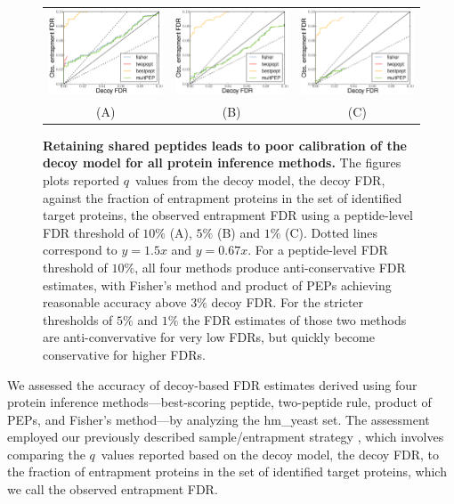 \documentclass{article}
\begin{document}
\begin{figure}
\begin{center}
\begin{tabular}{ccc} 
\includegraphics[width=0.3\linewidth]
  {./img/shared-pept-accuracy-fdr10} &
\includegraphics[width=0.3\linewidth]
  {./img/shared-pept-accuracy-fdr5} & 
\includegraphics[width=0.3\linewidth]
  {./img/shared-pept-accuracy-fdr1}\\
(A) & (B) & (C)
\end{tabular}
\caption{\label{fig:shared-accuracy}\textbf{Retaining shared peptides
    leads to poor calibration of the decoy model for all protein
    inference methods.} The figures plots reported $q$~values from the
  decoy model, the decoy FDR, against the fraction of entrapment
  proteins in the set of identified target proteins, the observed
  entrapment FDR using a peptide-level FDR threshold of $10\%$ (A),
  $5\%$ (B) and $1\%$ (C). Dotted lines correspond to $y=1.5x$ and
  $y=0.67x$.  For a peptide-level FDR threshold of $10\%$, all four
  methods produce anti-conservative FDR estimates, with Fisher's
  method and product of PEPs achieving reasonable accuracy above $3\%$
  decoy FDR. For the stricter thresholds of $5\%$ and $1\%$ the FDR
  estimates of those two methods are anti-convervative for very low
  FDRs, but quickly become conservative for higher FDRs.}
\end{center}
\end{figure}

We assessed the accuracy of decoy-based FDR estimates derived using
four protein inference methods---best-scoring peptide, two-peptide
rule, product of PEPs, and Fisher's method---by analyzing the
hm\_yeast set.  The assessment employed our previously described
sample/entrapment strategy \cite{granholm2013determining}, which
involves comparing the $q$~values reported based on the decoy model,
the decoy FDR, to the fraction of entrapment proteins in the set of
identified target proteins, which we call the observed entrapment FDR.
\end{document}
